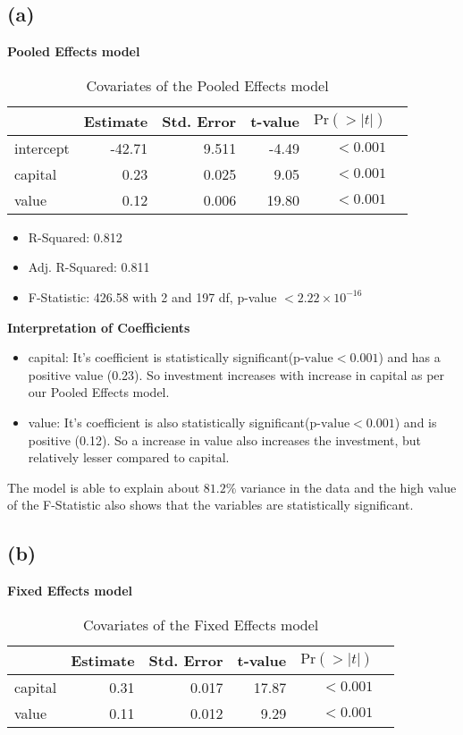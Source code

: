\documentclass[a4paper]{article}
\begin{document}
\subsection*{(a)}
\textbf{Pooled Effects model}
\begin{table}[ht]
    \centering
    \begin{tabular}{@{}lrrrrr@{}}
        \toprule
                & Estimate  & Std. Error  & t-value & \(\text{Pr}(>|t|)\)\\
                \midrule
        intercept & -42.71 & 9.511 & -4.49 & \(<0.001\)\\
        capital   & 0.23   & 0.025 & 9.05  & \(<0.001\)\\
        value     & 0.12   & 0.006 & 19.80 & \(<0.001\)\\
        \bottomrule
    \end{tabular}
    \caption{Covariates of the Pooled Effects model}
\end{table}
\begin{itemize}
    \item R-Squared: 0.812
    \item Adj. R-Squared: 0.811
    \item F-Statistic: 426.58 with 2 and 197 df, p-value \(<2.22 \times 10^{-16}\) 
\end{itemize}

\textbf{Interpretation of Coefficients}
\begin{itemize}
    \item capital: It's coefficient is statistically significant(\(\text{p-value}<0.001\)) and has a positive value (0.23). So investment increases with increase in capital as per our Pooled Effects model.
    \item value: It's coefficient is also statistically significant(\(\text{p-value}<0.001\)) and is positive (0.12). So a increase in value also increases the investment, but relatively lesser compared to capital. 
\end{itemize}

The model is able to explain about \(81.2\%\) variance in the data and the high value of the F-Statistic also shows that the variables are statistically significant.

\newpage
\subsection*{(b)}
\textbf{Fixed Effects model}
\begin{table}[ht]
    \centering
    \begin{tabular}{@{}lrrrrr@{}}
        \toprule
                & Estimate  & Std. Error  & t-value & \(\text{Pr}(>|t|)\)\\
                \midrule
        capital   & 0.31   & 0.017 & 17.87  & \(<0.001\)\\
        value     & 0.11   & 0.012 & 9.29 & \(<0.001\)\\
        \bottomrule
    \end{tabular}
    \caption{Covariates of the Fixed Effects model}
\end{table}
\end{document}
